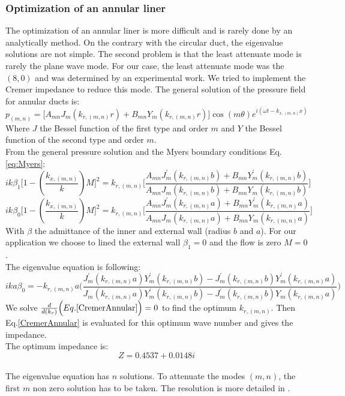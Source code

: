 \subsubsection{Optimization of an annular liner}
The optimization of an annular liner is more difficult and is rarely done by an analytically method. On the contrary with the circular duct, the eigenvalue solutions are not simple. The second problem is that the least attenuate mode is rarely the plane wave mode. For our case, the least attenuate mode was the $(8,0)$ and was determined by an experimental work. We tried to implement the Cremer impedance to reduce this mode.
The general solution of the pressure field for annular ducts is:
\begin{equation}
    p_{(m,n)}=\Big[A_{mn}J_m(k_{r,(m,n)}r)+B_{mn}Y_m(k_{r,(m,n)}r)\Big]\cos (m\theta) e^{i(\omega t-k_{x,(m,n)}x)}
\end{equation}
Where $J$ the Bessel function of the first type and order $m$ and $Y$ the Bessel function of the second type and order $m$.\\
From the general pressure solution and the Myers boundary conditions Eq.\eqref{eq:Myers}:
\begin{equation}
    ik\beta_1\Big[1-(\frac{k_{x,(m,n)}}{k})M\Big]^2=k_{r,(m,n)}\Bigg[\frac{A_{mn}J_m^'(k_{r,(m,n)}b)+B_{mn}Y_m^'(k_{r,(m,n)}b)}{A_{mn}J_m(k_{r,(m,n)}b)+B_{mn}Y_m(k_{r,(m,n)}b)}\Bigg]
\end{equation}
\begin{equation}
    ik\beta_0\Big[1-(\frac{k_{x,(m,n)}}{k})M\Big]^2=k_{r,(m,n)}\Bigg[\frac{A_{mn}J_m^'(k_{r,(m,n)}a)+B_{mn}Y_m^'(k_{r,(m,n)}a)}{A_{mn}J_m(k_{r,(m,n)}a)+B_{mn}Y_m(k_{r,(m,n)}a)}\Bigg]
\end{equation}
With $\beta$ the admittance of the inner and external wall (radius $b$ and $a$). For our application we choose to lined the external wall $\beta_1=0$ and the flow is zero $M=0$.\\
The eigenvalue equation is following:
\begin{equation}\label{CremerAnnular}
    ika\beta_0=-k_{r,(m,n)}a\Bigg(\frac{J_m^'(k_{r,(m,n)}a)Y_m^'(k_{r,(m,n)}b)-J_m^'(k_{r,(m,n)}b)Y_m^'(k_{r,(m,n)}a)}{J_m(k_{r,(m,n)}a)Y_m^'(k_{r,(m,n)}b)-J_m^'(k_{r,(m,n)}b)Y_m(k_{r,(m,n)}a)}\Bigg)
\end{equation}
We solve $\frac{d}{d(k_r)}\Big(Eq.\eqref{CremerAnnular}\Big)=0$ to find the optimum $k_{r,(m,n)}$. Then Eq.\eqref{CremerAnnular} is evaluated for this optimum wave number and gives the impedance.\\
The optimum impedance is: 
\begin{equation}
    Z=0.4537 + 0.0148i
\end{equation}\\
The eigenvalue equation has $n$ solutions. To attenuate the modes $(m,n)$, the first $m$ non zero solution has to be taken. The resolution is more detailed in .
\clearpage
